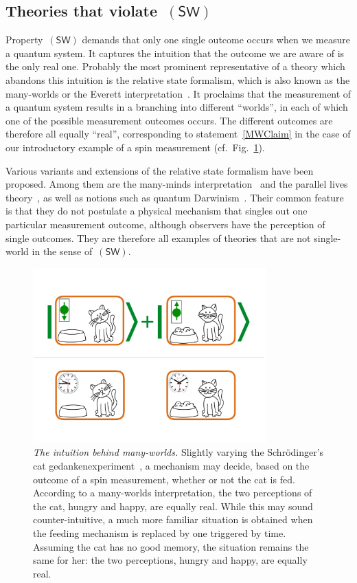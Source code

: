\documentclass{article}
\theoremstyle{plain}
\theoremstyle{definition}
\newcommand*{\SW}{\mathsf{(SW)}}
\begin{document}
\subsection{Theories that violate~$\SW$} \label{sec_vSW}

Property~$\SW$ demands that only one single outcome occurs when we measure a quantum system. It captures the intuition that the outcome we are aware of is the only real one. Probably the most prominent representative of a theory which abandons this intuition is the relative state formalism, which is also known as the many-worlds or the Everett interpretation~\cite{Everett57,Wheeler57,DeWitt70,Deutsch85,Deutsch97,Vaidman16}. It proclaims that  the measurement of a quantum system results in a branching into different ``worlds'', in each of which one of the possible measurement outcomes occurs. The different outcomes are therefore all equally ``real'', corresponding to statement~\eqref{MWClaim} in the case of our introductory example of a spin measurement (cf.\ Fig.~\ref{fig_MW}). 

Various variants and extensions of the relative state formalism have been proposed. Among them are the many-minds interpretation~\cite{Zeh70, AlbLoe88} and the parallel lives theory~\cite{Brassard13}, as well as notions such as quantum Darwinism~\cite{Zurek07}. Their common feature is that they do not postulate a physical mechanism that singles out one particular measurement outcome, although observers have the perception of single outcomes. They are therefore all examples of theories that are not single-world in the sense of~$\SW$. 

\begin{figure}[t]
\centering
\includegraphics[trim= 0.4cm  0.2cm 1cm 4cm, clip=true, width=0.8\textwidth]{ManyWorldsTime.pdf}
\caption{\emph{The intuition behind many-worlds.}   Slightly varying the Schr\"odinger's cat gedankenexperiment~\cite{Schroedinger35},  a mechanism may decide, based on the outcome of a spin measurement, whether or not the cat is fed. According to a many-worlds interpretation, the two perceptions of the cat, hungry and happy, are equally real. While this may sound counter-intuitive, a much more familiar situation is obtained when the feeding mechanism is replaced by one triggered by time.  Assuming the cat has no good memory, the situation remains the same for her: the two perceptions, hungry and happy, are equally real.
\label{fig_MW}
}
\end{figure}
\end{document}
